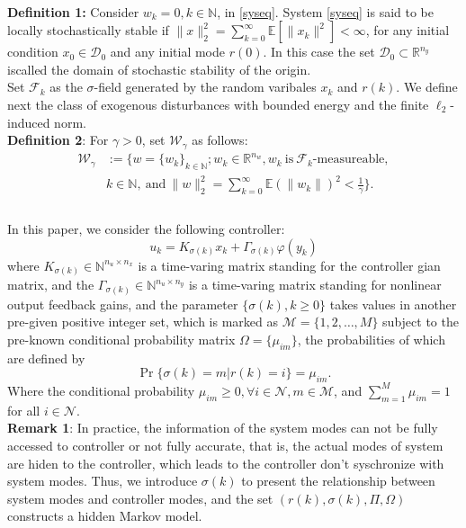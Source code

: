 \documentclass[conference]{IEEEtran}
\begin{document}
\\
\textbf{Definition 1:} Consider $w_k=0, k\in \mathbb{N}$, in \eqref{syseq}. System \eqref{syseq} is said to be locally stochastically stable if $\|x\|^2_2=\sum_{k=0}^{\infty}\mathbb{E}[\|x_k\|^2]<\infty$, for any initial condition $x_0\in \mathcal{D}_0$ and any initial mode $r(0)$. In this case the set $\mathcal{D}_0 \subset \mathbb{R}^{n_y}$ iscalled the domain of stochastic stability of the origin.     
\\
Set $\mathcal{F}_k$ as the $\sigma$-field generated by the random varibales $x_k$ and $r(k)$. We define next the class of exogenous disturbances with bounded energy and the finite $\ell_2$-induced norm.
\\
\textbf{Definition 2}: For $\gamma>0$, set $\mathcal{W}_{\gamma}$ as follows:
\begin{equation}
\begin{split}
\mathcal{W}_{\gamma}&:=\{w=\{w_k\}_{k\in\mathbb{N}};w_k\in\mathbb{R}^{n_w}, w_k \ \text{is}\  \mathcal{F}_k\text{-measureable},\\
 			&k\in\mathbb{N}, \ \text{and}\  \|w\|^2_2=\sum_{k=0}^{\infty}\mathbb{E}(\|w_k\|)^2<\frac{1}{\gamma}\}.\\
\end{split}
\end{equation}
\\
In this paper, we consider the following controller:
\begin{equation}\label{asycontroller}
u_k=K_{\sigma(k)}x_k+\varGamma_{\sigma(k)}\varphi(y_k) 
\end{equation}
where $K_{\sigma(k)}\in \mathbb{N}^{n_u\times n_x}$ is a time-varing matrix standing for the controller gian matrix, and the $\varGamma_{\sigma(k)}\in \mathbb{N}^{n_u\times n_y}$ is a time-varing matrix standing for nonlinear output feedback gains, and the parameter $\{\sigma(k),k\geq0\}$ takes values in another pre-given positive integer set, which is marked as $\mathcal{M}=\{1,2,\dots,M\}$ subject to the pre-known conditional probability matrix $\Omega=\{\mu_{im}\}$, the probabilities of which are defined by
\begin{equation}
\Pr\{\sigma(k)=m|r(k)=i\}=\mu_{im}.
\end{equation}
Where the conditional probability $\mu_{im}\geq0, \forall i\in\mathcal{N},m\in\mathcal{M}$, and $\sum_{m=1}^{M}\mu_{im}=1$ for all $i\in\mathcal{N}$.
\\
\textbf{Remark 1}: In practice, the information of the system modes can not be fully accessed to controller or not fully accurate, that is, the actual modes of system are hiden to the controller, which leads to the controller don't syschronize with system modes. Thus, we introduce $\sigma(k)$ to present the relationship between system modes and controller modes, and the set $(r(k),\sigma(k),\Pi,\Omega)$ constructs a hidden Markov model. 
\end{document}
